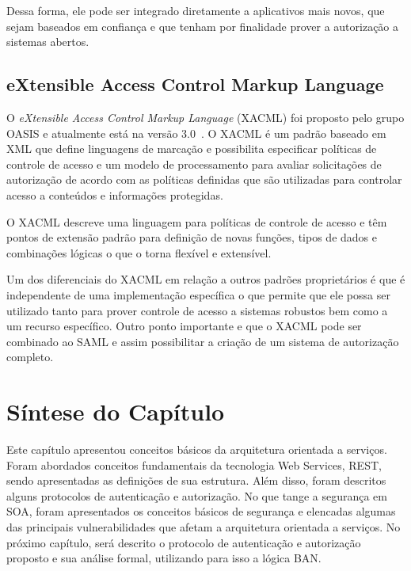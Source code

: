 Dessa forma, ele pode ser integrado diretamente a aplicativos mais novos, que sejam baseados em confiança e que tenham por finalidade  prover a autorização a sistemas abertos.

\subsection{eXtensible Access Control Markup Language}
O \emph{eXtensible Access Control Markup Language} (XACML) foi proposto pelo grupo OASIS e atualmente está na versão 3.0~\cite{XACML}. O XACML é um padrão baseado em XML que define linguagens de marcação e possibilita especificar políticas de controle de acesso e um modelo de processamento para avaliar solicitações de autorização de acordo com as políticas definidas que são utilizadas para controlar acesso a conteúdos e informações protegidas.

O XACML descreve uma linguagem para políticas de controle de acesso e têm pontos de extensão padrão para definição de novas funções, tipos de dados e combinações lógicas o que o torna flexível e extensível.

Um dos diferenciais do XACML em relação a outros padrões proprietários é que é independente de uma implementação específica o que permite que ele possa ser utilizado tanto para prover controle de acesso a sistemas robustos bem como a um recurso específico. Outro ponto importante e que o XACML pode ser combinado ao SAML e assim possibilitar a criação de um sistema de autorização completo.

\section{Síntese do Capítulo}

Este capítulo apresentou conceitos básicos da arquitetura orientada a serviços. Foram abordados conceitos fundamentais da tecnologia Web Services, REST, sendo apresentadas as definições de sua estrutura. Além disso, foram descritos alguns protocolos de autenticação e autorização. No que tange a segurança em SOA, foram apresentados os conceitos básicos de segurança e elencadas algumas das principais vulnerabilidades que afetam a arquitetura orientada a serviços. No próximo capítulo, será descrito o protocolo de autenticação e autorização proposto e sua análise formal, utilizando para isso a lógica BAN.
